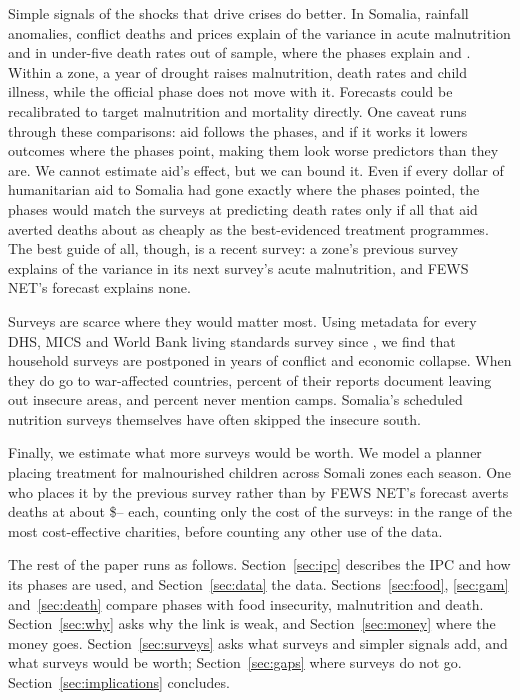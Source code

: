 \documentclass[11pt]{article}
\begin{document}
Simple signals of the shocks that drive crises do better. In Somalia, rainfall anomalies, conflict deaths and prices explain \trGamTrig{} of the variance in acute malnutrition and \trUfiveTrig{} in under-five death rates out of sample, where the phases explain \trGamPhase{} and \trUfivePhase{}. Within a zone, a year of drought raises malnutrition, death rates and child illness, while the official phase does not move with it. Forecasts could be recalibrated to target malnutrition and mortality directly. One caveat runs through these comparisons: aid follows the phases, and if it works it lowers outcomes where the phases point, making them look worse predictors than they are. We cannot estimate aid's effect, but we can bound it. Even if every dollar of humanitarian aid to Somalia had gone exactly where the phases pointed, the phases would match the surveys at predicting death rates only if all that aid averted deaths about as cheaply as the best-evidenced treatment programmes. The best guide of all, though, is a recent survey: a zone's previous survey explains \fsRtwoLag{} of the variance in its next survey's acute malnutrition, and FEWS NET's forecast explains none.

Surveys are scarce where they would matter most. Using metadata for every DHS, MICS and World Bank living standards survey since \gapYearZero{}, we find that household surveys are postponed in years of conflict and economic collapse. When they do go to war-affected countries, \exWar{} percent of their reports document leaving out insecure areas, and \exCampsSilent{} percent never mention camps. Somalia's scheduled nutrition surveys themselves have often skipped the insecure south.

Finally, we estimate what more surveys would be worth. We model a planner placing treatment for malnourished children across Somali zones each season. One who places it by the previous survey rather than by FEWS NET's forecast averts deaths at about \$\voiRangeLo{}--\voiRangeHi{} each, counting only the cost of the surveys: in the range of the most cost-effective charities, before counting any other use of the data.

The rest of the paper runs as follows. Section~\ref{sec:ipc} describes the IPC and how its phases are used, and Section~\ref{sec:data} the data. Sections~\ref{sec:food}, \ref{sec:gam} and~\ref{sec:death} compare phases with food insecurity, malnutrition and death. Section~\ref{sec:why} asks why the link is weak, and Section~\ref{sec:money} where the money goes. Section~\ref{sec:surveys} asks what surveys and simpler signals add, and what surveys would be worth; Section~\ref{sec:gaps} where surveys do not go. Section~\ref{sec:implications} concludes.
\end{document}

